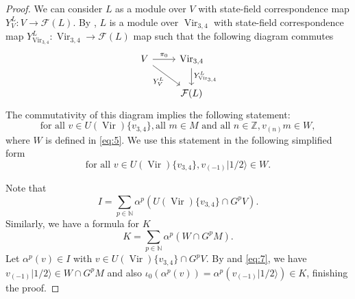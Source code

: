\documentclass[12pt, reqno]{amsart}
\theoremstyle{remark}
\DeclareMathOperator{\Vir}{Vir}
\newcommand{\vachalf}{|1/2\rangle}
\begin{document}
\begin{proof}
  We can consider $L$ as a module over $V$ with state-field correspondence map $Y^L_{V}: V \to \mathcal{F}(L)$.
  By \cite[Theorem 4.2]{wang_rationality_1993}, $L$ is a module over $\Vir_{3,4}$ with state-field correspondence map $Y^L_{\Vir_{3, 4}}: \Vir_{3, 4} \to \mathcal{F}(L)$ map such that the following diagram commutes
  \begin{equation*}
    \begin{tikzcd}
      V \arrow[r, "\pi_0"] \arrow[rd, "{Y^{L}_{V}}"'] & {\Vir_{3, 4}} \arrow[d, "{Y^{L}_{\Vir_{3, 4}}}"] \\
      & {\mathcal{F}(L)}
    \end{tikzcd}
  \end{equation*}
  The commutativity of this diagram implies the following statement:
  \begin{equation*}
    \text{for all }v \in U(\Vir)\{v_{3, 4}\}, \text{all } m \in M\text{ and  all }n \in \mathbb{Z}, v_{(n)}m \in W,
  \end{equation*}
  where $W$ is defined in \eqref{eq:5}.
  We use this statement in the following simplified form
  \begin{equation}
    \label{eq:7}
    \text{for all }v \in U(\Vir)\{v_{3, 4}\}, v_{(-1)}\vachalf \in W.
  \end{equation}
  
  Note that
  \begin{equation*}
    I = \sum_{p \in \mathbb{N}}\alpha^p(U(\Vir)\{v_{3, 4}\} \cap G^pV).
  \end{equation*}
  Similarly, we have a formula for $K$
  \begin{equation*}
    K = \sum_{p \in \mathbb{N}}\alpha^p(W \cap G^pM).
  \end{equation*}
  Let $\alpha^p(v) \in I$ with $v \in U(\Vir)\{v_{3, 4}\} \cap G^pV$.
  By  and \eqref{eq:7}, we have $v_{(-1)}\vachalf \in W \cap G^pM$ and also $\iota_0(\alpha^p(v)) = \alpha^p(v_{(-1)}\vachalf) \in K$, finishing the proof.
\end{proof}
\end{document}
